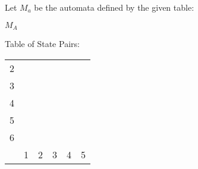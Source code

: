 Let $M_a$ be the automata defined by the given table:
\begin{automata}{$M_A$}
	
	
	
	
	
	
	
	
\end{automata}

Table of State Pairs:
\begin{center} \begin{tabular}{*{6}{c|}}
									\cline{1-2}
	2 &  						\\	\cline{1-3}
	3 &   &  					\\	\cline{1-4}
	4 &   &   &  				\\	\cline{1-5}
	5 &   &   &   &  			\\	\cline{1-6}
	6 &   &   &   &   &  		\\	\hline
	  & 1 & 2 & 3 & 4 & 5		\\
\end{tabular} \end{center}